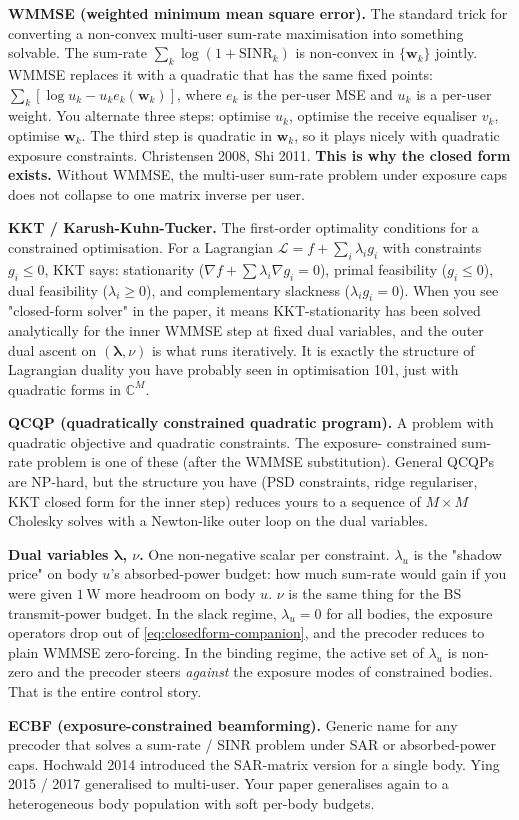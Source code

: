 \documentclass[11pt]{article}
\newenvironment{defs}[1][]{%
  \begin{mdframed}[backgroundcolor=blue!4,linecolor=blue!40!black,
    linewidth=0.4pt,roundcorner=2pt,innertopmargin=8pt,
    innerbottommargin=8pt,innerleftmargin=10pt,innerrightmargin=10pt,
    frametitle={\textbf{#1}},frametitlebackgroundcolor=blue!10]%
}{\end{mdframed}}
\newcommand{\ww}{\mathbf{w}}
\begin{document}
\begin{defs}[Precoding terms cheat sheet]
\textbf{WMMSE (weighted minimum mean square error).} The standard
trick for converting a non-convex multi-user sum-rate maximisation
into something solvable. The sum-rate $\sum_k \log(1 + \mathrm{SINR}_k)$
is non-convex in $\{\ww_k\}$ jointly. WMMSE replaces it with a quadratic
that has the same fixed points: $\sum_k [\log u_k - u_k e_k(\ww_k)]$,
where $e_k$ is the per-user MSE and $u_k$ is a per-user weight. You
alternate three steps: optimise $u_k$, optimise the receive equaliser
$v_k$, optimise $\ww_k$. The third step is quadratic in $\ww_k$, so it
plays nicely with quadratic exposure constraints. Christensen 2008,
Shi 2011. \textbf{This is why the closed form exists.} Without WMMSE,
the multi-user sum-rate problem under exposure caps does not collapse
to one matrix inverse per user.

\textbf{KKT / Karush-Kuhn-Tucker.} The first-order optimality conditions
for a constrained optimisation. For a Lagrangian
$\mathcal{L} = f + \sum_i \lambda_i g_i$ with constraints $g_i \leq 0$,
KKT says: stationarity ($\nabla f + \sum \lambda_i \nabla g_i = 0$),
primal feasibility ($g_i \leq 0$), dual feasibility ($\lambda_i \geq 0$),
and complementary slackness ($\lambda_i g_i = 0$). When you see
"closed-form solver" in the paper, it means KKT-stationarity has
been solved analytically for the inner WMMSE step at fixed dual
variables, and the outer dual ascent on $(\bm\lambda, \nu)$ is what
runs iteratively. It is exactly the structure of Lagrangian duality
you have probably seen in optimisation 101, just with quadratic forms
in $\mathbb{C}^M$.

\textbf{QCQP (quadratically constrained quadratic program).} A problem
with quadratic objective and quadratic constraints. The exposure-
constrained sum-rate problem is one of these (after the WMMSE
substitution). General QCQPs are NP-hard, but the structure you have
(PSD constraints, ridge regulariser, KKT closed form for the inner
step) reduces yours to a sequence of $M\times M$ Cholesky solves with
a Newton-like outer loop on the dual variables.

\textbf{Dual variables $\bm\lambda$, $\nu$.} One non-negative scalar
per constraint. $\lambda_u$ is the "shadow price" on body $u$'s
absorbed-power budget: how much sum-rate would gain if you were given
$1\,$\textmu W more headroom on body $u$. $\nu$ is the same thing for
the BS transmit-power budget. In the slack regime,
$\lambda_u = 0$ for all bodies, the exposure operators drop out of
\cref{eq:closedform-companion}, and the precoder reduces to plain WMMSE
zero-forcing. In the binding regime, the active set of $\lambda_u$ is
non-zero and the precoder steers \emph{against} the exposure modes of
constrained bodies. That is the entire control story.

\textbf{ECBF (exposure-constrained beamforming).} Generic name for any
precoder that solves a sum-rate / SINR problem under SAR or
absorbed-power caps. Hochwald 2014 introduced the SAR-matrix version
for a single body. Ying 2015 / 2017 generalised to multi-user. Your
paper generalises again to a heterogeneous body population with
soft per-body budgets.
\end{defs}
\end{document}
